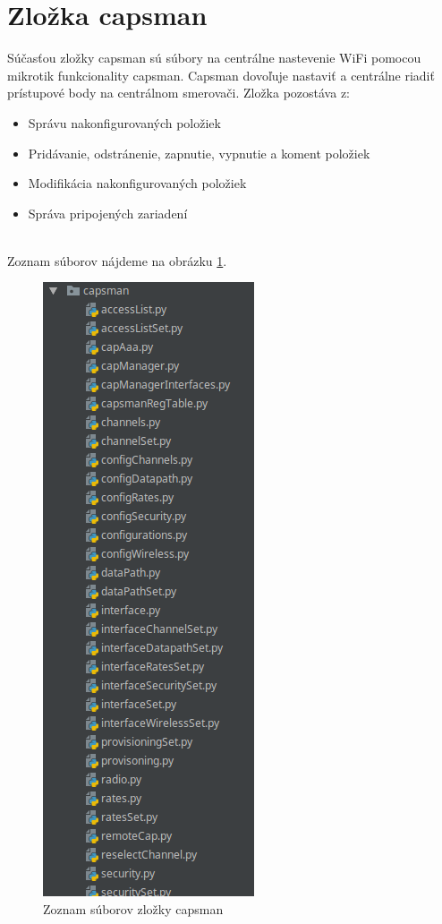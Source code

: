 \section{Zložka capsman}
\label{sec:capsmanchap}
Súčasťou zložky capsman sú súbory na centrálne nastevenie WiFi pomocou mikrotik funkcionality capsman. Capsman dovoľuje nastaviť a centrálne riadiť prístupové body na centrálnom smerovači.
Zložka pozostáva z:\begin{itemize}
\item Správu nakonfigurovaných položiek
\item Pridávanie, odstránenie, zapnutie, vypnutie a koment položiek
\item Modifikácia nakonfigurovaných položiek
\item Správa pripojených zariadení
\end{itemize}
\\Zoznam súborov nájdeme na obrázku \ref{fig:capsman}. 
\begin{figure}[H]
\centering
\includegraphics[scale=0.6]{../text/capsman.png}
\caption{Zoznam súborov zložky capsman}
\label{fig:capsman}
\end{figure}
